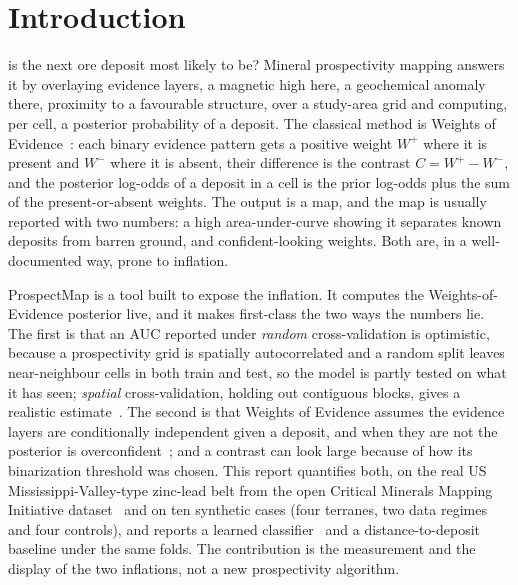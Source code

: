 \documentclass[journal]{IEEEtran}
\begin{document}
\section{Introduction}

 is the next ore deposit most likely to be? Mineral prospectivity mapping answers it by
overlaying evidence layers, a magnetic high here, a geochemical anomaly there, proximity to a favourable
structure, over a study-area grid and computing, per cell, a posterior probability of a deposit. The classical
method is Weights of Evidence~\cite{bonham94,bonham89}: each binary evidence pattern gets a positive weight
$W^+$ where it is present and $W^-$ where it is absent, their difference is the contrast $C=W^+-W^-$, and the
posterior log-odds of a deposit in a cell is the prior log-odds plus the sum of the present-or-absent weights.
The output is a map, and the map is usually reported with two numbers: a high area-under-curve showing it separates
known deposits from barren ground, and confident-looking weights. Both are, in a well-documented way, prone to
inflation.

ProspectMap is a tool built to expose the inflation. It computes the Weights-of-Evidence
posterior live, and it makes first-class the two ways the numbers lie. The first is that an AUC reported under
\emph{random} cross-validation is optimistic, because a prospectivity grid is spatially autocorrelated and a
random split leaves near-neighbour cells in both train and test, so the model is partly tested on what it has
seen; \emph{spatial} cross-validation, holding out contiguous blocks, gives a realistic estimate~\cite{roberts}. The
second is that Weights of Evidence assumes the evidence layers are conditionally independent given a deposit, and
when they are not the posterior is overconfident~\cite{agterberg}; and a contrast can look large because of
how its binarization threshold was chosen. This report quantifies both, on the real US Mississippi-Valley-type
zinc-lead belt from the open Critical Minerals Mapping Initiative dataset~\cite{lawley} and on ten synthetic
cases (four terranes, two data regimes and four controls), and reports a learned classifier~\cite{rodriguez} and
a distance-to-deposit baseline under the same folds. The contribution is the measurement and the display of the two
inflations, not a new prospectivity algorithm.
\end{document}
